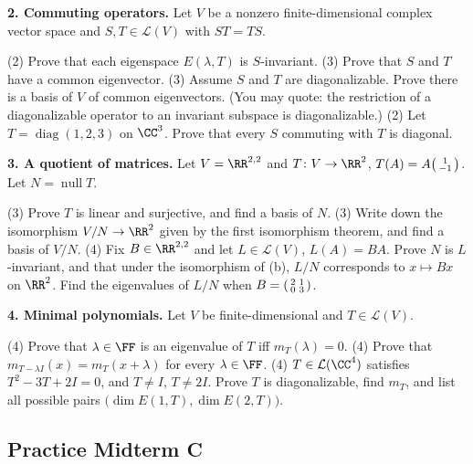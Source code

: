 \documentclass[10pt]{scrartcl}
\DeclareMathOperator{\nul}{null}
\newcommand{\LL}{\mathcal L}
\begin{document}
\medskip\noindent\textbf{2. Commuting operators.} Let $V$ be a nonzero finite-dimensional complex vector space and $S,T\in\LL(V)$ with $ST=TS$.
\begin{enumerate}[a)]
  \ii (2) Prove that each eigenspace $E(\lambda,T)$ is $S$-invariant.
  \ii (3) Prove that $S$ and $T$ have a common eigenvector.
  \ii (3) Assume $S$ and $T$ are diagonalizable. Prove there is a basis of $V$ of common eigenvectors. (You may quote: the restriction of a diagonalizable operator to an invariant subspace is diagonalizable.)
  \ii (2) Let $T=\operatorname{diag}(1,2,3)$ on $\CC^3$. Prove that every $S$ commuting with $T$ is diagonal.
\end{enumerate}

\medskip\noindent\textbf{3. A quotient of matrices.} Let $V=\RR^{2,2}$ and $T\colon V\to\RR^2$, $T(A)=A\begin{psmallmatrix}1\\-1\end{psmallmatrix}$. Let $N=\nul T$.
\begin{enumerate}[a)]
  \ii (3) Prove $T$ is linear and surjective, and find a basis of $N$.
  \ii (3) Write down the isomorphism $V/N\to\RR^2$ given by the first isomorphism theorem, and find a basis of $V/N$.
  \ii (4) Fix $B\in\RR^{2,2}$ and let $L\in\LL(V)$, $L(A)=BA$. Prove $N$ is $L$-invariant, and that under the isomorphism of (b), $L/N$ corresponds to $x\mapsto Bx$ on $\RR^2$. Find the eigenvalues of $L/N$ when $B=\begin{psmallmatrix}2&1\\0&3\end{psmallmatrix}$.
\end{enumerate}

\medskip\noindent\textbf{4. Minimal polynomials.} Let $V$ be finite-dimensional and $T\in\LL(V)$.
\begin{enumerate}[a)]
  \ii (4) Prove that $\lambda\in\FF$ is an eigenvalue of $T$ iff $m_T(\lambda)=0$.
  \ii (4) Prove that $m_{T-\lambda I}(x)=m_T(x+\lambda)$ for every $\lambda\in\FF$.
  \ii (4) $T\in\LL(\CC^4)$ satisfies $T^2-3T+2I=0$, and $T\ne I$, $T\ne2I$. Prove $T$ is diagonalizable, find $m_T$, and list all possible pairs $\big(\dim E(1,T),\dim E(2,T)\big)$.
\end{enumerate}

\endgroup
\clearpage\begingroup\subsection{Practice Midterm C}
\end{document}
